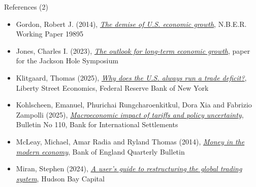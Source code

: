 \documentclass[10pt,handout]{beamer}
\begin{document}
\begin{frame}{References (2)}
\begin{itemize}

    \item Gordon, Robert J. (2014), \href{https://www.nber.org/system/files/working_papers/w19895/w19895.pdf}{\emph{The demise of U.S. economic growth}}, N.B.E.R. Working Paper 19895

    \item Jones, Charles I. (2023), \href{https://www.kansascityfed.org/Jackson/\%20Hole/documents/9771/GrowthOutlookPanel.pdf}{\emph{The outlook for long-term economic growth}}, paper for the Jackson Hole Symposium

    \item Klitgaard, Thomas (2025), \href{https://libertystreeteconomics.newyorkfed.org/2025/05/why-does-the-u-s-always-run-a-trade-deficit/}{\emph{Why does the U.S. always run a trade deficit?}}, Liberty Street Economics, Federal Reserve Bank of New York

    \item Kohlscheen, Emanuel, Phurichai Rungcharoenkitkul, Dora Xia and Fabrizio Zampolli (2025), \href{https://www.bis.org/publ/bisbull110.pdf}{\emph{Macroeconomic impact of tariffs and policy uncertainty}}, Bulletin No 110, Bank for International Settlements

    \item McLeay, Michael, Amar Radia and Ryland Thomas (2014), \href{https://www.bankofengland.co.uk/-/media/boe/files/quarterly-bulletin/2014/money-in-the-modern-economy-an-introduction.pdf}{\emph{Money in the modern economy}}, Bank of England Quarterly Bulletin

    \item Miran, Stephen (2024), \href{https://www.hudsonbaycapital.com/documents/FG/hudsonbay/research/638199_A_Users_Guide_to_Restructuring_the_Global_Trading_System.pdf}{\emph{A user's guide to restructuring the global trading system}}, Hudson Bay Capital

\end{itemize}
\end{frame}
\end{document}
